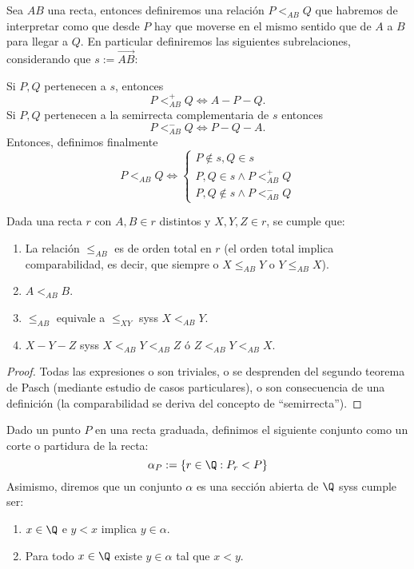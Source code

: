 \documentclass[11pt,a4paper]{book}
\begin{document}
\begin{mydef}
Sea $AB$ una recta, entonces definiremos una relación $P<_{AB}Q$ que habremos de interpretar como que desde $P$ hay que moverse en el mismo sentido que de $A$ a $B$ para llegar a $Q$. En particular definiremos las siguientes subrelaciones, considerando que $s:=\overrightarrow{AB}$:

Si $P, Q$ pertenecen a $s$, entonces
$$P<^+_{AB}Q\iff A-P-Q.$$
Si $P, Q$ pertenecen a la semirrecta complementaria de $s$ entonces
$$P<^-_{AB}Q\iff P-Q-A.$$
Entonces, definimos finalmente
$$P<_{AB}Q\iff\begin{cases}
P\notin s,Q\in s\\
P,Q\in s\wedge P<^+_{AB}Q\\
P,Q\notin s\wedge P<^-_{AB}Q
\end{cases}$$
\end{mydef}
\begin{thm}
Dada una recta $r$ con $A,B\in r$ distintos y $X,Y,Z\in r$, se cumple que:
\begin{enumerate}
\item La relación $\leq_{AB}$ es de orden total en $r$ (el orden total implica comparabilidad, es decir, que siempre o $X\leq_{AB}Y$ o $Y\leq_{AB}X$).
\item $A<_{AB}B$.
\item $\leq_{AB}$ equivale a $\leq_{XY}$ syss $X<_{AB}Y$.
\item $X-Y-Z$ syss $X<_{AB}Y<_{AB}Z$ ó $Z<_{AB}Y<_{AB}X$.
\end{enumerate}
\end{thm}
\begin{proof}
Todas las expresiones o son triviales, o se desprenden del segundo teorema de Pasch (mediante estudio de casos particulares), o son consecuencia de una definición (la comparabilidad se deriva del concepto de ``semirrecta'').
\end{proof}
\begin{mydef}
Dado un punto $P$ en una recta graduada, definimos el siguiente conjunto como un corte o partidura de la recta:
$$\alpha_P:=\{r\in\Q:P_r<P\}$$
Asimismo, diremos que un conjunto $\alpha$ es una sección abierta de $\Q$ syss cumple ser:
\begin{enumerate}[$a)$]
\item $x\in\Q$ e $y<x$ implica $y\in\alpha$.
\item Para todo $x\in\Q$ existe $y\in\alpha$ tal que $x<y$.
\end{enumerate}
\end{mydef}
\end{document}
